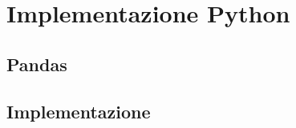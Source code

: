 \chapter{Implementazione Python}

	\lipsum

	\section{Pandas}

		\lipsum

	\section{Implementazione}

		\lipsum